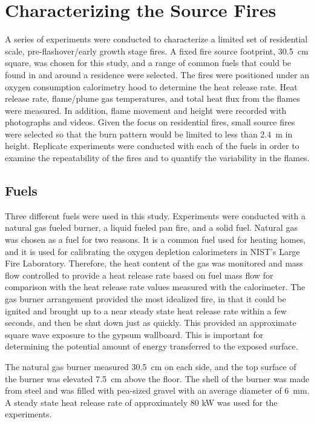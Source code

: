 \documentclass[twoside]{uocthesis}
\begin{document}
{\chapter{Characterizing the Source Fires}
\label{chapter:Characterizing the Source Fires}

A series of experiments were conducted to characterize a limited set of  residential scale, pre-flashover/early growth stage fires.  A fixed fire source footprint, 30.5~cm square, was chosen for this study, and a range of common fuels that could be found in and around a residence were selected.  The fires were positioned under an oxygen consumption calorimetry hood to determine the heat release rate.  Heat release rate, flame/plume gas temperatures, and total heat flux from the flames were measured.  In addition, flame movement and height were recorded with photographs and videos.  Given the focus on residential fires, small source fires were selected so that the burn pattern would be limited to less than 2.4~m in height.  Replicate experiments were conducted with each of the fuels in order to examine the repeatability of the fires and to quantify the variability in the flames.

\section{Fuels}

Three different fuels were used in this study.  Experiments were conducted with a natural gas fueled burner, a liquid fueled pan fire, and a solid fuel. Natural gas was chosen as a fuel for two reasons.  It is a common fuel used for heating homes, and it is used for calibrating the oxygen depletion calorimeters in NIST's Large Fire Laboratory.  Therefore, the heat content of the gas was monitored and mass flow controlled to provide a heat release rate based on fuel mass flow for comparison with the heat release rate values measured with the calorimeter.  The gas burner arrangement provided the most idealized fire, in that it could be ignited and brought up to a near steady state heat release rate within a few seconds, and then be shut down just as quickly.  This provided an approximate square wave exposure to the gypsum wallboard.  This is important for determining the potential amount of energy transferred to the exposed surface.

The natural gas burner measured 30.5~cm on each side, and the top surface of the burner was elevated 7.5~cm above the floor. The shell of the burner was made from steel and was filled with pea-sized gravel with an average diameter of 6~mm.  A steady state heat release rate of approximately 80 kW was used for the experiments.

}
\end{document}
